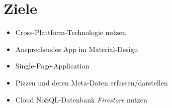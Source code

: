 \section{Ziele}

\begin{itemize}
    \itemsep-0.4em
    \item Cross-Plattform-Technologie nutzen
    \item Ansprechendes App im Material-Design
    \item Single-Page-Application
    \item Pizzen und deren Meta-Daten erfassen/darstellen
    \item Cloud NoSQL-Datenbank \textit{Firestore} nutzen
\end{itemize}
